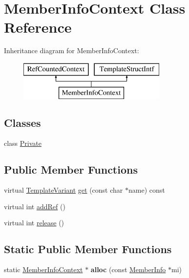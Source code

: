 \hypertarget{class_member_info_context}{}\section{Member\+Info\+Context Class Reference}
\label{class_member_info_context}
Inheritance diagram for Member\+Info\+Context\+:\begin{figure}[H]
\begin{center}
\leavevmode
\includegraphics[height=2.000000cm]{class_member_info_context}
\end{center}
\end{figure}
\subsection*{Classes}
\begin{DoxyCompactItemize}
\item 
class \mbox{\hyperlink{class_member_info_context_1_1_private}{Private}}
\end{DoxyCompactItemize}
\subsection*{Public Member Functions}
\begin{DoxyCompactItemize}
\item 
virtual \mbox{\hyperlink{class_template_variant}{Template\+Variant}} \mbox{\hyperlink{class_member_info_context_a320895b057801bfc3d53c281d9c565d8}{get}} (const char $\ast$name) const
\item 
virtual int \mbox{\hyperlink{class_member_info_context_a9f19c4a3fb7164d1daf4772d4de3703f}{add\+Ref}} ()
\item 
virtual int \mbox{\hyperlink{class_member_info_context_a079b37ec712b039f5cb3eaf93e2a8f24}{release}} ()
\end{DoxyCompactItemize}
\subsection*{Static Public Member Functions}
\begin{DoxyCompactItemize}
\item 
\mbox{\label{class_member_info_context_a2027031bf7cc979f691785eb27fa2246}} 
static \mbox{\hyperlink{class_member_info_context}{Member\+Info\+Context}} $\ast$ {\bfseries alloc} (const \mbox{\hyperlink{struct_member_info}{Member\+Info}} $\ast$mi)
\end{DoxyCompactItemize}


